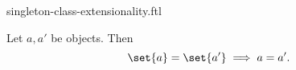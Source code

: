 \documentclass{stex}
\begin{document}
\begin{smodule}{singleton-class-extensionality.ftl}

  \begin{forthel}
  \end{forthel}

  \begin{forthel}
    \begin{proposition}
      Let $a, a'$ be objects.
      Then \[ \set{a} = \set{a'} \implies a = a'. \]
    \end{proposition}
  \end{forthel}
\end{smodule}
\end{document}
